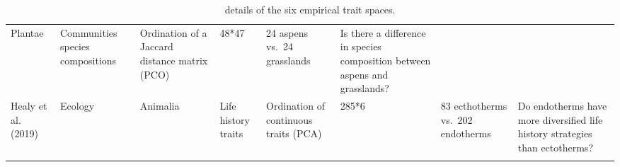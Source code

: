 \documentclass[]{article}
\begin{document}
\begin{longtable}[]{@{}llllllll@{}}
\begin{minipage}[t]{0.08444\columnwidth}
Plantae\strut
\end{minipage} & \begin{minipage}[t]{0.13\columnwidth}\raggedright\strut
Communities species compositions\strut
\end{minipage} & \begin{minipage}[t]{0.11\columnwidth}\raggedright\strut
Ordination of a Jaccard distance matrix (PCO)\strut
\end{minipage} & \begin{minipage}[t]{0.08444\columnwidth}\raggedright\strut
48*47\strut
\end{minipage} & \begin{minipage}[t]{0.07\columnwidth}\raggedright\strut
24 aspens vs.~24 grasslands\strut
\end{minipage} & \begin{minipage}[t]{0.15\columnwidth}\raggedright\strut
Is there a difference in species composition between aspens and
grasslands?\strut
\end{minipage}\tabularnewline
\begin{minipage}[t]{0.08444\columnwidth}\raggedright\strut
Healy et al. (2019)\strut
\end{minipage} & \begin{minipage}[t]{0.08444\columnwidth}\raggedright\strut
Ecology\strut
\end{minipage} & \begin{minipage}[t]{0.08444\columnwidth}\raggedright\strut
Animalia\strut
\end{minipage} & \begin{minipage}[t]{0.13\columnwidth}\raggedright\strut
Life history traits\strut
\end{minipage} & \begin{minipage}[t]{0.11\columnwidth}\raggedright\strut
Ordination of continuous traits (PCA)\strut
\end{minipage} & \begin{minipage}[t]{0.08444\columnwidth}\raggedright\strut
285*6\strut
\end{minipage} & \begin{minipage}[t]{0.07\columnwidth}\raggedright\strut
83 ecthotherms vs.~202 endotherms\strut
\end{minipage} & \begin{minipage}[t]{0.15\columnwidth}\raggedright\strut
Do endotherms have more diversified life history strategies than
ectotherms?\strut
\end{minipage}\tabularnewline
\bottomrule
\caption{details of the six empirical trait spaces.}
\end{longtable}
\end{document}
